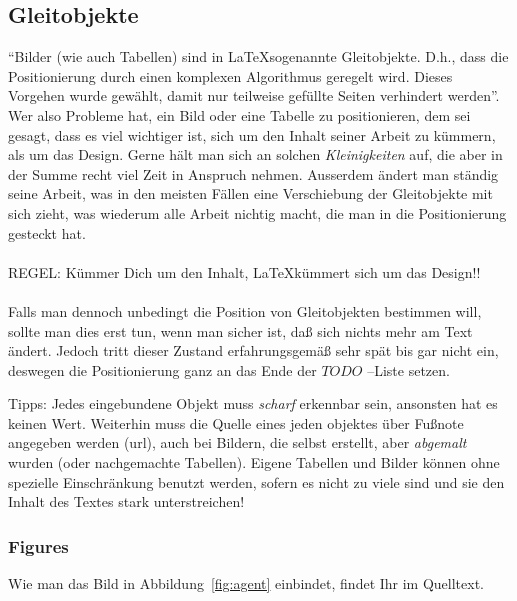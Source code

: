 \subsection{Gleitobjekte}
\label{gleitobj}
``Bilder (wie auch Tabellen) sind in \LaTeX sogenannte Gleitobjekte. D.h., dass die Positionierung durch einen komplexen Algorithmus geregelt wird. Dieses Vorgehen wurde gewählt, damit nur teilweise gefüllte Seiten verhindert werden''\cite{fitz}.
Wer also Probleme hat, ein Bild oder eine Tabelle zu positionieren, dem sei gesagt, dass es viel wichtiger ist, sich um den Inhalt seiner Arbeit zu kümmern, als um das Design. Gerne hält man sich an solchen {\em Kleinigkeiten} auf, die aber in der Summe recht viel Zeit in Anspruch nehmen. Ausserdem ändert man ständig seine Arbeit, was in den meisten Fällen eine Verschiebung der Gleitobjekte mit sich zieht, was wiederum alle Arbeit nichtig macht, die man in die Positionierung gesteckt hat. \\\\
{\Large REGEL: Kümmer Dich um den Inhalt, \LaTeX kümmert sich um das Design!!}\\\\
Falls man dennoch unbedingt die Position von Gleitobjekten bestimmen will, sollte man dies erst tun, wenn man sicher ist, daß sich nichts mehr am Text ändert. Jedoch tritt dieser Zustand erfahrungsgemäß sehr spät bis gar nicht ein, deswegen die Positionierung ganz an das Ende der $TODO$ --Liste setzen.

Tipps: Jedes eingebundene Objekt muss {\em scharf} erkennbar sein, ansonsten hat es keinen Wert. Weiterhin muss die Quelle eines jeden objektes über Fußnote angegeben werden (url), auch bei Bildern, die selbst erstellt, aber {\em abgemalt} wurden (oder nachgemachte Tabellen). Eigene Tabellen und Bilder können ohne spezielle Einschränkung benutzt werden, sofern es nicht zu viele sind und sie den Inhalt des Textes stark unterstreichen!
\subsubsection{Figures}
Wie man das Bild in Abbildung~\ref{fig:agent} einbindet, findet Ihr im Quelltext.

